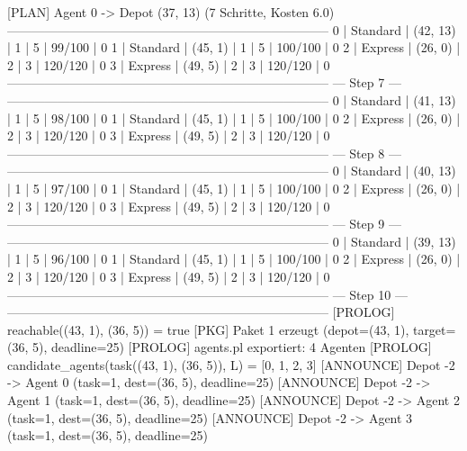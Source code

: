 [PLAN]      Agent 0 -> Depot (37, 13) (7 Schritte, Kosten 6.0)
-----------------------------------------------------------------------------
 0     | Standard  | (42, 13)    | 1       | 5          | 99/100    | 0
 1     | Standard  | (45, 1)     | 1       | 5          | 100/100   | 0
 2     | Express   | (26, 0)     | 2       | 3          | 120/120   | 0
 3     | Express   | (49, 5)     | 2       | 3          | 120/120   | 0
-----------------------------------------------------------------------------
                                --- Step 7 ---
-----------------------------------------------------------------------------
 0     | Standard  | (41, 13)    | 1       | 5          | 98/100    | 0
 1     | Standard  | (45, 1)     | 1       | 5          | 100/100   | 0
 2     | Express   | (26, 0)     | 2       | 3          | 120/120   | 0
 3     | Express   | (49, 5)     | 2       | 3          | 120/120   | 0
-----------------------------------------------------------------------------
                                --- Step 8 ---
-----------------------------------------------------------------------------
 0     | Standard  | (40, 13)    | 1       | 5          | 97/100    | 0
 1     | Standard  | (45, 1)     | 1       | 5          | 100/100   | 0
 2     | Express   | (26, 0)     | 2       | 3          | 120/120   | 0
 3     | Express   | (49, 5)     | 2       | 3          | 120/120   | 0
-----------------------------------------------------------------------------
                                --- Step 9 ---
-----------------------------------------------------------------------------
 0     | Standard  | (39, 13)    | 1       | 5          | 96/100    | 0
 1     | Standard  | (45, 1)     | 1       | 5          | 100/100   | 0
 2     | Express   | (26, 0)     | 2       | 3          | 120/120   | 0
 3     | Express   | (49, 5)     | 2       | 3          | 120/120   | 0
-----------------------------------------------------------------------------
                               --- Step 10 ---
-----------------------------------------------------------------------------
[PROLOG]   reachable((43, 1), (36, 5)) = true
[PKG]      Paket 1 erzeugt (depot=(43, 1), target=(36, 5), deadline=25)
[PROLOG]   agents.pl exportiert: 4 Agenten
[PROLOG]   candidate_agents(task((43, 1), (36, 5)), L) = [0, 1, 2, 3]
[ANNOUNCE] Depot -2 -> Agent 0 (task=1, dest=(36, 5), deadline=25)
[ANNOUNCE] Depot -2 -> Agent 1 (task=1, dest=(36, 5), deadline=25)
[ANNOUNCE] Depot -2 -> Agent 2 (task=1, dest=(36, 5), deadline=25)
[ANNOUNCE] Depot -2 -> Agent 3 (task=1, dest=(36, 5), deadline=25)
